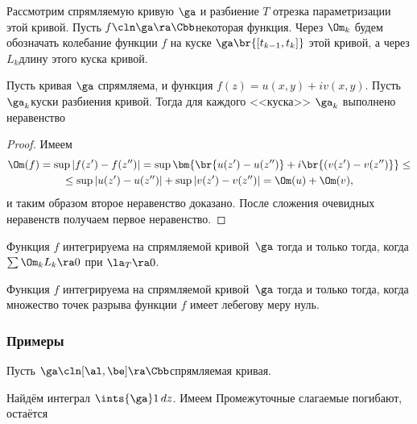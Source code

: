 \documentclass[a4paper]{article}
\begin{document}
\begin{solution}
Рассмотрим спрямляемую кривую $\ga$ и разбиение $T$ отрезка параметризации этой кривой.
Пусть $f\cln\ga\ra\Cbb$\т некоторая функция. Через $\Om_k$ будем обозначать колебание функции $f$ на
куске $\ga\br{[t_{k-1},t_k]}$ этой кривой, а через $L_k$\т длину этого куска кривой.

\begin{stm}
Пусть кривая $\ga$ спрямляема, и функция $f(z) = u(x,y)+iv(x,y)$. Пусть $\ga_k$\т куски разбиения кривой.
Тогда для каждого <<куска>> $\ga_k$ выполнено неравенство
\end{stm}
\begin{proof}
Имеем
\begin{multline}
\Om(f) = \sup |f(z')-f(z'')| = \sup \bm{\br{u(z')- u(z'')}+i\br{(v(z')-v(z'')}} \le\\
\le \sup |u(z')-u(z'')| + \sup |v(z')-v(z'')| = \Om(u) + \Om(v),
\end{multline}
и таким образом второе неравенство доказано.
После сложения очевидных неравенств
получаем первое неравенство.
\end{proof}

\begin{theorem}
Функция $f$ интегрируема на спрямляемой кривой~$\ga$ тогда и только тогда, когда $\sum \Om_k L_k \ra 0$ при $\la_T\ra 0$.
\end{theorem}

\begin{theorem}
Функция $f$ интегрируема на спрямляемой кривой~$\ga$ тогда и только тогда, когда множество точек
разрыва функции $f$ имеет лебегову меру нуль.
\end{theorem}

\subsubsection{Примеры}

Пусть $\ga\cln[\al,\be]\ra\Cbb$\т спрямляемая кривая.

\begin{ex}
Найдём интеграл $\ints{\ga}1\,dz$. Имеем
Промежуточные слагаемые погибают, остаётся
\end{ex}


\end{solution}
\end{document}
